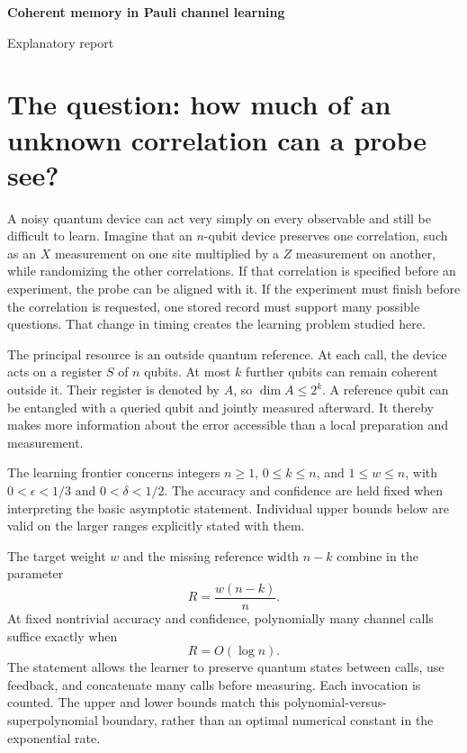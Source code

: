\documentclass[11pt,a4paper]{article}
\numberwithin{equation}{section}
\theoremstyle{definition}
\theoremstyle{remark}
\begin{document}
\thispagestyle{plain}
\begin{center}
  {\color{ReportNavy}\LARGE\bfseries Coherent memory in Pauli channel learning\par}
  \vspace{0.5em}
  {\small Explanatory report}
\end{center}
\vspace{0.25em}
\noindent{\color{ReportTeal}\rule{\textwidth}{0.6pt}}
\vspace{0.3em}

\section{The question: how much of an unknown correlation can a probe see?}
A noisy quantum device can act very simply on every observable and still be difficult to learn. Imagine that an \(n\)-qubit device preserves one correlation, such as an \(X\) measurement on one site multiplied by a \(Z\) measurement on another, while randomizing the other correlations. If that correlation is specified before an experiment, the probe can be aligned with it. If the experiment must finish before the correlation is requested, one stored record must support many possible questions. That change in timing creates the learning problem studied here.

The principal resource is an outside quantum reference. At each call, the device acts on a register \(S\) of \(n\) qubits. At most \(k\) further qubits can remain coherent outside it. Their register is denoted by \(A\), so \(\dim A\leq 2^k\). A reference qubit can be entangled with a queried qubit and jointly measured afterward. It thereby makes more information about the error accessible than a local preparation and measurement.

The learning frontier concerns integers \(n\geq1\), \(0\leq k\leq n\), and \(1\leq w\leq n\), with \(0<\epsilon<1/3\) and \(0<\delta<1/2\). The accuracy and confidence are held fixed when interpreting the basic asymptotic statement. Individual upper bounds below are valid on the larger ranges explicitly stated with them.

The target weight \(w\) and the missing reference width \(n-k\) combine in the parameter
\begin{equation}
 R=\frac{w(n-k)}{n}.
 \label{eq:plmt-R}
\end{equation}
At fixed nontrivial accuracy and confidence, polynomially many channel calls suffice exactly when
\begin{equation}
 \boxed{R=O(\log n).}
 \label{eq:plmt-frontier}
\end{equation}
The statement allows the learner to preserve quantum states between calls, use feedback, and concatenate many calls before measuring. Each invocation is counted. The upper and lower bounds match this polynomial-versus-superpolynomial boundary, rather than an optimal numerical constant in the exponential rate.
\end{document}
